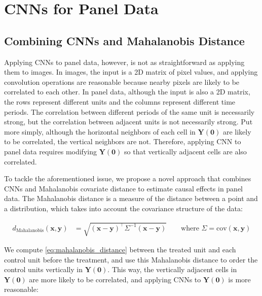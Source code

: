 \section{CNNs for Panel Data}


\subsection{Combining CNNs and Mahalanobis Distance}

Applying CNNs to panel data, however, is not as straightforward as applying them to images.
In images, the input is a 2D matrix of pixel values, and applying convolution operations are reasonable
because nearby pixels are likely to be correlated to each other.
In panel data, although the input is also a 2D matrix, the rows represent different units and the columns represent different time periods.
The correlation between different periods of the same unit is necessarily strong, but the correlation between adjacent units is not necessarily strong.
Put more simply, although the horizontal neighbors of each cell in $\mathbf{Y(0)}$ are likely to be correlated, the vertical neighbors are not.
Therefore, applying CNN to panel data requires modifying $\mathbf{Y(0)}$ so that vertically adjacent cells are also correlated.

To tackle the aforementioned issue, we propose a novel approach that combines CNNs and Mahalanobis covariate distance to estimate causal effects in panel data.
The Mahalanobis distance is a measure of the distance between a point and a distribution, which takes into account the covariance structure of the data:

\begin{align}
    d_{\text{Mahalanobis}}(\mathbf{x}, \mathbf{y}) &= \sqrt{(\mathbf{x} - \mathbf{y})^\top \Sigma^{-1} (\mathbf{x} - \mathbf{y})}  \qquad \text{where } \Sigma = \text{cov}(\mathbf{x}, \mathbf{y})\label{eq:mahalanobis_distance}
\end{align}

We compute \eqref{eq:mahalanobis_distance} between the treated unit and each control unit before the treatment, 
and use this Mahalanobis distance to order the control units vertically in $\mathbf{Y(0)}$.
This way, the vertically adjacent cells in $\mathbf{Y(0)}$ are more likely to be correlated, and applying CNNs to $\mathbf{Y(0)}$ is more reasonable:

